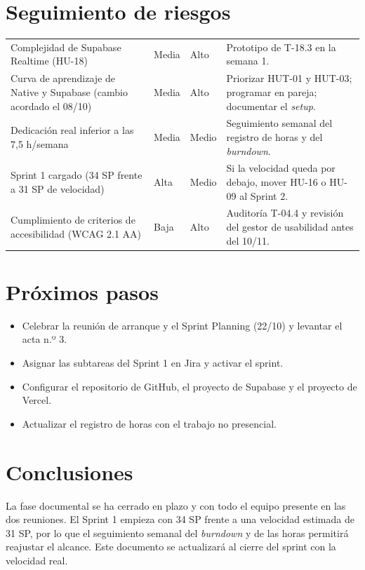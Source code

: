 \documentclass[11pt,a4paper]{article}
\begin{document}
\section{Seguimiento de riesgos}
\begin{longtable}{|P{3.8cm}|C{1.7cm}|C{1.7cm}|P{7.8cm}|}
\hline
{} &  &  &  \\ \hline
\endhead
Complejidad de Supabase Realtime (HU-18) & Media & Alto & Prototipo de T-18.3 en la semana 1. \\ \hline
Curva de aprendizaje de Native y Supabase (cambio acordado el 08/10) & Media & Alto & Priorizar HUT-01 y HUT-03; programar en pareja; documentar el \textit{setup}. \\ \hline
Dedicación real inferior a las 7,5 h/semana & Media & Medio & Seguimiento semanal del registro de horas y del \textit{burndown}. \\ \hline
Sprint 1 cargado (34 SP frente a 31 SP de velocidad) & Alta & Medio & Si la velocidad queda por debajo, mover HU-16 o HU-09 al Sprint 2. \\ \hline
Cumplimiento de criterios de accesibilidad (WCAG 2.1 AA) & Baja & Alto & Auditoría T-04.4 y revisión del gestor de usabilidad antes del 10/11. \\ \hline
\end{longtable}

\section{Próximos pasos}
\begin{itemize}
\item Celebrar la reunión de arranque y el Sprint Planning (22/10) y levantar el acta n.º 3.
\item Asignar las subtareas del Sprint 1 en Jira y activar el sprint.
\item Configurar el repositorio de GitHub, el proyecto de Supabase y el proyecto de Vercel.
\item Actualizar el registro de horas con el trabajo no presencial.
\end{itemize}

\section{Conclusiones}
La fase documental se ha cerrado en plazo y con todo el equipo presente en las dos reuniones. El Sprint 1 empieza con 34 SP frente a una velocidad estimada de 31 SP, por lo que el seguimiento semanal del \textit{burndown} y de las horas permitirá reajustar el alcance. Este documento se actualizará al cierre del sprint con la velocidad real.
\end{document}
